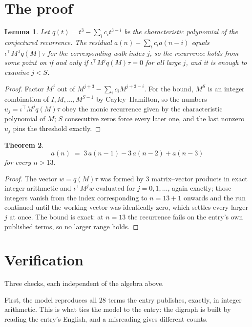 \documentclass[11pt,a4paper]{article}
\theoremstyle{plain}
\newtheorem{theorem}{Theorem}
\newtheorem{lemma}[theorem]{Lemma}
\theoremstyle{definition}
\begin{document}
\section{The proof}

\begin{lemma}\label{lem:crit}
Let $q(t)=t^{3}-\sum_i c_it^{3-i}$ be the characteristic polynomial of the
conjectured recurrence. The residual $a(n)-\sum_ic_ia(n-i)$ equals
$\iota^{\!\top}M^{\,j}q(M)\tau$ for the corresponding walk index $j$, so the recurrence
holds from some point on if and only if $\iota^{\!\top}M^{j}q(M)\tau=0$ for all large $j$,
and it is enough to examine $j<S$.
\end{lemma}

\begin{proof}
Factor $M^{j}$ out of $M^{j+3}-\sum_ic_iM^{j+3-i}$. For the bound, $M^{S}$
is an integer combination of $I,M,\dots,M^{S-1}$ by Cayley--Hamilton, so the numbers
$u_j=\iota^{\!\top}M^{j}q(M)\tau$ obey the monic recurrence given by the characteristic
polynomial of $M$; $S$ consecutive zeros force every later one, and the last nonzero $u_j$
pins the threshold exactly.
\end{proof}

\begin{theorem}
\[
a(n)\;=\;3\,a(n-1) - 3\,a(n-2) + a(n-3)
\]
for every $n>13$.
\end{theorem}

\begin{proof}
The vector $w=q(M)\tau$ was formed by $3$ matrix--vector products in exact integer
arithmetic and $\iota^{\!\top}M^{j}w$ evaluated for $j=0,1,\dots$, again exactly; those
integers vanish from the index corresponding to $n=13+1$ onwards and the run continued
until the working vector was identically zero, which settles every larger $j$ at once. The bound is exact: at $n=13$ the recurrence fails on the entry's own published terms, so no larger range holds.
\end{proof}

\section{Verification}

Three checks, each independent of the algebra above.

First, the model reproduces all $28$ terms the entry publishes, exactly, in integer
arithmetic. This is what ties the model to the entry: the digraph is built by reading the
entry's English, and a misreading gives different counts.
\end{document}
